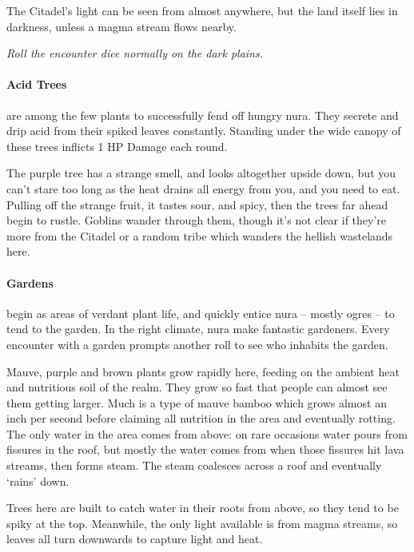 \begin{multicols}{2}
The Citadel's light can be seen from almost anywhere, but the land itself lies in darkness, unless a magma stream flows nearby.

\textit{Roll the encounter dice normally on the dark plains.}

\paragraph{Acid Trees}
are among the few plants to successfully fend off hungry nura.
They secrete and drip acid from their spiked leaves constantly.
Standing under the wide canopy of these trees inflicts 1 HP Damage each round.

\begin{boxtext}

  The purple tree has a strange smell, and looks altogether upside down, but you can't stare too long as the heat drains all energy from you, and you need to eat.
Pulling off the strange fruit, it tastes sour, and spicy, then the trees far ahead begin to rustle.
Goblins wander through them, though it's not clear if they're more from the Citadel or a random tribe which wanders the hellish wastelands here.

\end{boxtext}

\paragraph{Gardens}
begin as areas of verdant plant life, and quickly entice nura -- mostly ogres -- to tend to the garden.
In the right climate, nura make fantastic gardeners.
Every encounter with a garden prompts another roll to see who inhabits the garden.

Mauve, purple and brown plants grow rapidly here, feeding on the ambient heat and nutritious soil of the realm.
They grow so fast that people can almost see them getting larger.
Much is a type of mauve bamboo which grows almost an inch per second before claiming all nutrition in the area and eventually rotting.
The only water in the area comes from above: on rare occasions water pours from fissures in the roof, but mostly the water comes from when those fissures hit lava streams, then forms steam.
The steam coalesces across a roof and eventually `rains' down.

Trees here are built to catch water in their roots from above, so they tend to be spiky at the top.
Meanwhile, the only light available is from magma streams, so leaves all turn downwards to capture light and heat.


\end{multicols}
